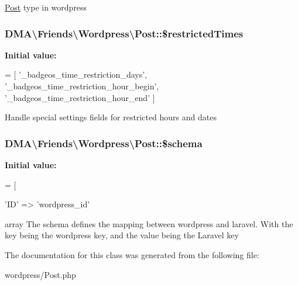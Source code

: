 \hyperlink{classDMA_1_1Friends_1_1Wordpress_1_1Post}{Post} type in wordpress \hypertarget{classDMA_1_1Friends_1_1Wordpress_1_1Post_ac0b74792fa83b0a9dafda52eec451e50}{
\subsubsection[{\$restricted\-Times}]{\setlength{\rightskip}{0pt plus 5cm}D\-M\-A\textbackslash{}\-Friends\textbackslash{}\-Wordpress\textbackslash{}\-Post\-::\$restricted\-Times\hspace{0.3cm}{\ttfamily [protected]}}}\label{classDMA_1_1Friends_1_1Wordpress_1_1Post_ac0b74792fa83b0a9dafda52eec451e50}
{\bfseries Initial value\-:}
\begin{DoxyCode}
= [
        \textcolor{stringliteral}{'\_badgeos\_time\_restriction\_days'},
        \textcolor{stringliteral}{'\_badgeos\_time\_restriction\_hour\_begin'},
        \textcolor{stringliteral}{'\_badgeos\_time\_restriction\_hour\_end'}
    ]
\end{DoxyCode}
Handle special settings fields for restricted hours and dates \hypertarget{classDMA_1_1Friends_1_1Wordpress_1_1Post_a38fc35f2a6a04046e386cfd3f3564d89}{
\subsubsection[{\$schema}]{\setlength{\rightskip}{0pt plus 5cm}D\-M\-A\textbackslash{}\-Friends\textbackslash{}\-Wordpress\textbackslash{}\-Post\-::\$schema}}\label{classDMA_1_1Friends_1_1Wordpress_1_1Post_a38fc35f2a6a04046e386cfd3f3564d89}
{\bfseries Initial value\-:}
\begin{DoxyCode}
= [
        
        \textcolor{stringliteral}{'ID'}                                            => \textcolor{stringliteral}{'wordpress\_id'}
\end{DoxyCode}
array The schema defines the mapping between wordpress and laravel. With the key being the wordpress key, and the value being the Laravel key 

The documentation for this class was generated from the following file\-:\begin{DoxyCompactItemize}
\item 
wordpress/Post.\-php\end{DoxyCompactItemize}
